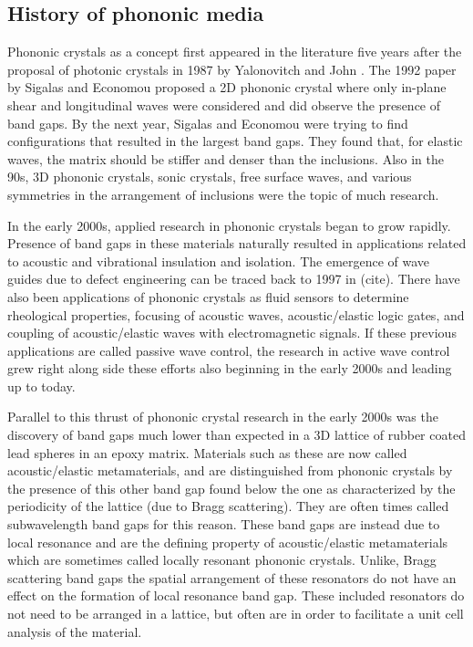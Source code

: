 \documentclass{article}
\begin{document}
\subsection{History of phononic media}
Phononic crystals as a concept first appeared in the literature five years 
after the proposal of photonic crystals in 1987 by Yalonovitch and John 
\cite{hussein14}. The 1992 paper by Sigalas and Economou proposed a 2D phononic 
crystal where only in-plane shear and longitudinal waves were considered and 
did observe the presence of band gaps. By the next year, Sigalas and Economou 
were trying to find configurations that resulted in the largest band gaps. They 
found that, for elastic waves, the matrix should be stiffer and denser than the 
inclusions. Also in the 90s, 3D phononic crystals, sonic crystals, free surface 
waves, and various symmetries in the arrangement of inclusions were the topic 
of much research. 

In the early 2000s, applied research in phononic crystals began to grow 
rapidly. Presence of band gaps in these materials naturally resulted in 
applications related to acoustic and vibrational insulation and isolation. The 
emergence of wave guides due to defect engineering can be traced back to 1997 
in (cite). There have also been applications of phononic crystals as fluid 
sensors to determine rheological properties, focusing of acoustic waves, 
acoustic/elastic logic gates, and coupling of acoustic/elastic waves with 
electromagnetic signals. If these previous applications are called passive wave 
control, the research in active wave control grew right along side these 
efforts also beginning in the early 2000s and leading up to today.

Parallel to this thrust of phononic crystal research in the early 2000s was the 
discovery of band gaps much lower than expected in a 3D lattice of rubber 
coated lead spheres in an epoxy matrix. Materials such as these are now called 
acoustic/elastic metamaterials, and are distinguished from phononic crystals by 
the presence of this other band gap found below the one as characterized by the 
periodicity of the lattice (due to Bragg scattering). They are often times 
called subwavelength band gaps for this reason. These band gaps are instead due 
to local resonance and are the defining property of acoustic/elastic 
metamaterials which are sometimes called locally resonant phononic crystals. 
Unlike, Bragg scattering band gaps the spatial arrangement of these resonators 
do not have an effect on the formation of local resonance band gap. These 
included resonators do not need to be arranged in a lattice, but often are in 
order to facilitate a unit cell analysis of the material.
\end{document}
